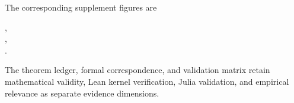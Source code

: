 The corresponding supplement figures are
\begin{center}
,\\
,\\
.
\end{center}
The theorem ledger, formal correspondence, and validation matrix retain
mathematical validity, Lean kernel verification, Julia validation, and
empirical relevance as separate evidence dimensions.
